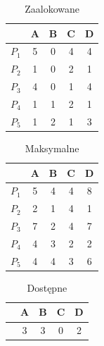 \documentclass{beamer}
\begin{document}
\begin{frame}
\begin{table}
  \centering
    \begin{tabular}{| c | c | c | c | c |}
    \hline
    & A & B & C & D \\ 
    \hline
    $P_1$ & 5 & 0 & 4 & 4 \\
    \hline
    $P_2$ & 1 & 0 & 2 & 1 \\
    \hline
    $P_3$ & 4 & 0 & 1 & 4 \\
    \hline
    $P_4$ & 1 & 1 & 2 & 1 \\
    \hline
    $P_5$ & 1 & 2 & 1 & 3 \\
    \hline
    \end{tabular}
  \caption{Zaalokowane}
\end{table}

\begin{table}
  \centering
    \begin{tabular}{| c | c | c | c | c |}
    \hline
    & A & B & C & D \\ 
    \hline
    $P_1$ & 5 & 4 & 4 & 8 \\
    \hline
    $P_2$ & 2 & 1 & 4 & 1 \\
    \hline
    $P_3$ & 7 & 2 & 4 & 7 \\
    \hline
    $P_4$ & 4 & 3 & 2 & 2 \\
    \hline
    $P_5$ & 4 & 4 & 3 & 6 \\
    \hline
    \end{tabular}
  \caption{Maksymalne}
\end{table}


\begin{table}
  \centering
    \begin{tabular}{| c | c | c | c | c |}
    \hline
    & A & B & C & D \\ 
    \hline
    & 3 & 3 & 0 & 2 \\
    \hline
    \end{tabular}
  \caption{Dostępne}
\end{table}


\end{frame}
\end{document}
